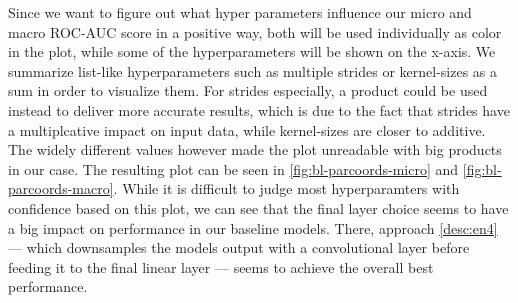 Since we want to figure out what hyper parameters influence our micro and macro ROC-AUC score in a positive way, both will be used individually as color in the plot, while some of the hyperparameters will be shown on the x-axis. We summarize list-like hyperparameters such as multiple strides or kernel-sizes as a sum in order to visualize them. For strides especially, a product could be used instead to deliver more accurate results, which is due to the fact that strides have a multiplcative impact on input data, while kernel-sizes are closer to additive. The widely different values however made the plot unreadable with big products in our case. The resulting plot can be seen in \autoref{fig:bl-parcoords-micro} and \autoref{fig:bl-parcoords-macro}. While it is difficult to judge most hyperparamters with confidence based on this plot, we can see that the final layer choice seems to have a big impact on performance in our baseline models. There, approach \ref{desc:en4} --- which downsamples the models output with a convolutional layer before feeding it to the final linear layer --- seems to achieve the overall best performance.
